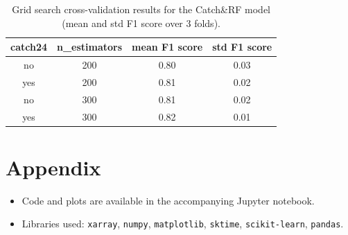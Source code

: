 \documentclass[a4paper,11pt]{article}
\begin{document}
\begin{table}[htbp]
    \centering
    \begin{tabular}{|c|c|c|c|}
        \hline
        \textbf{catch24} & \textbf{n\_estimators} & \textbf{mean F1 score} & \textbf{std F1 score} \\
        \hline
        no & 200 & 0.80 & 0.03 \\
        yes & 200 & 0.81 & 0.02 \\
        no & 300 & 0.81 & 0.02 \\
        yes & 300 & 0.82 & 0.01 \\
        \hline
    \end{tabular}
    \caption{Grid search cross-validation results for the Catch\&RF model (mean and std F1 score over 3 folds).}
    \label{tab:cv-results-catch22}
\end{table}




\section*{Appendix}
\begin{itemize}
    \item Code and plots are available in the accompanying Jupyter notebook.
    \item Libraries used: \texttt{xarray}, \texttt{numpy}, \texttt{matplotlib}, \texttt{sktime}, \texttt{scikit-learn}, \texttt{pandas}.
\end{itemize}
\end{document}
